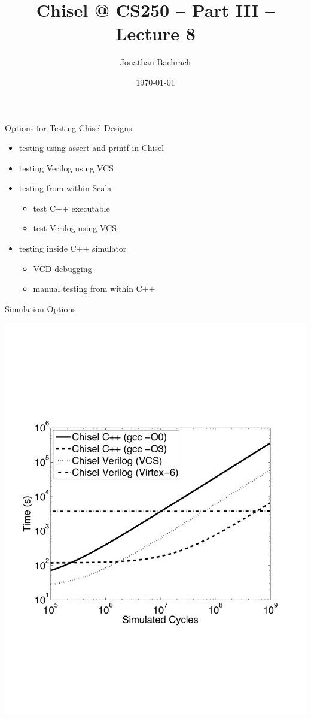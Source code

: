 \documentclass[xcolor=pdflatex,dvipsnames,table]{beamer}
\title{Chisel @ CS250 -- Part III -- Lecture 8}
\author{Jonathan Bachrach}
\date{\today}
\institute[UC Berkeley]{EECS UC Berkeley}
\begin{document}
\begin{frame}
\titlepage
\end{frame}
\addtocounter{framenumber}{-1}

\begin{frame}{Options for Testing Chisel Designs}
\begin{itemize}
\item testing using assert and printf in Chisel
\item testing Verilog using VCS
\item testing from within Scala
\begin{itemize}
\item test C++ executable
\item test Verilog using VCS
\end{itemize}
\item testing inside C++ simulator
\begin{itemize}
\item VCD debugging
\item manual testing from within C++
\end{itemize}
\end{itemize}
\end{frame}

\begin{frame}{Simulation Options}
\begin{center}
\includegraphics[height=0.9\textheight]{../talks/dac12/figs/perf.pdf}
\end{center}
\end{frame}
\end{document}

